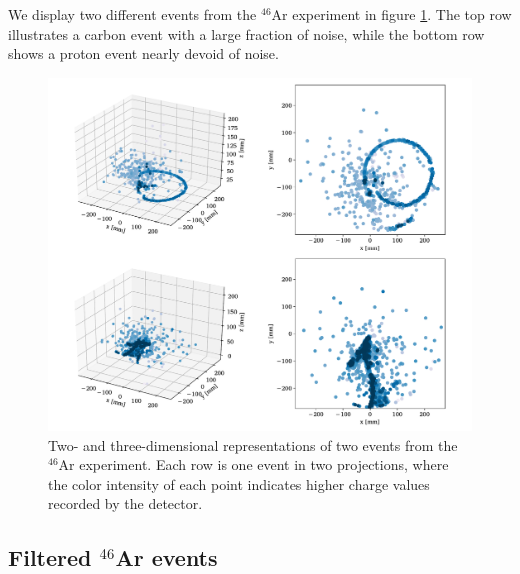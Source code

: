 \documentclass[review,number,sort&compress]{elsarticle}
\begin{document}

We display two different events from the ${}^{46}$Ar experiment in figure \ref{fig:samples}. The top row illustrates a carbon event with a large fraction of noise, while the bottom row shows a proton event nearly devoid of noise.

\begin{figure}[ht]
\centering
\includegraphics[width=\textwidth]{custom_work/examples_raw.pdf}
\caption[Displaying unfiltered events in 2D and 3D]{Two- and three-dimensional representations of two events from the ${}^{46}$Ar experiment. Each row is one event in two projections, where the color intensity of each point indicates higher charge values recorded by the detector.}\label{fig:samples}
\end{figure}

\subsection{Filtered \texorpdfstring{${}^{46}$Ar}{46Ar} events}\label{sec:filtered}
\end{document}
